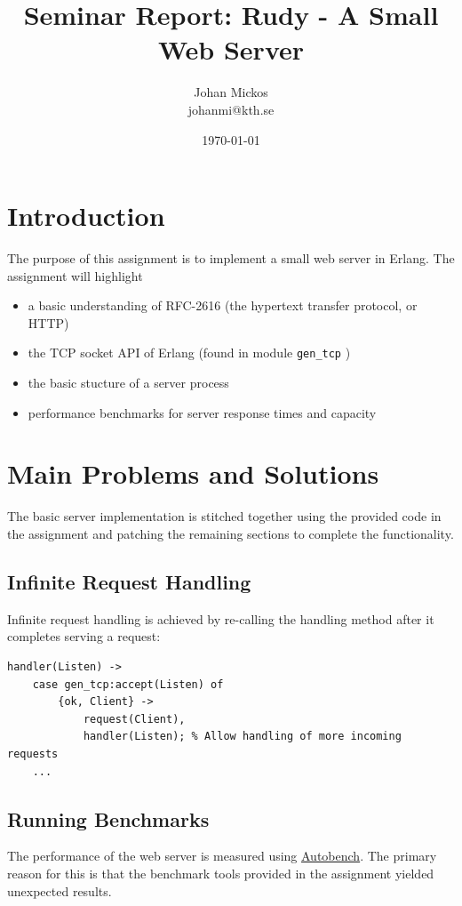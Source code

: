\documentclass[a4paper, 11pt]{article}
\title{Seminar Report: Rudy - A Small Web Server}
\author{Johan Mickos \\ johanmi@kth.se}
\date{\today{}}
\begin{document}
\maketitle
\newpage

\section{Introduction}

The purpose of this assignment is to implement a small web server in Erlang. The assignment will highlight
\begin{itemize}
    \item a basic understanding of RFC-2616 (the hypertext transfer protocol, or HTTP)
    \item the TCP socket API of Erlang (found in module \texttt{gen\_tcp} )
    \item the basic stucture of a server process
    \item performance benchmarks for server response times and capacity
\end{itemize}

\section{Main Problems and Solutions}

The basic server implementation is stitched together using the provided code in the assignment and patching the remaining sections to complete the functionality.

\subsection{Infinite Request Handling}
Infinite request handling is achieved by re-calling the handling method after it completes serving a request:
\begin{verbatim}
handler(Listen) ->
    case gen_tcp:accept(Listen) of
        {ok, Client} ->
            request(Client),
            handler(Listen); % Allow handling of more incoming requests
    ...
\end{verbatim}

\subsection{Running Benchmarks}
The performance of the web server is measured using \href{http://www.xenoclast.org/autobench/}{Autobench}. The primary reason for this is that the benchmark tools provided in the assignment yielded unexpected results.
\end{document}

